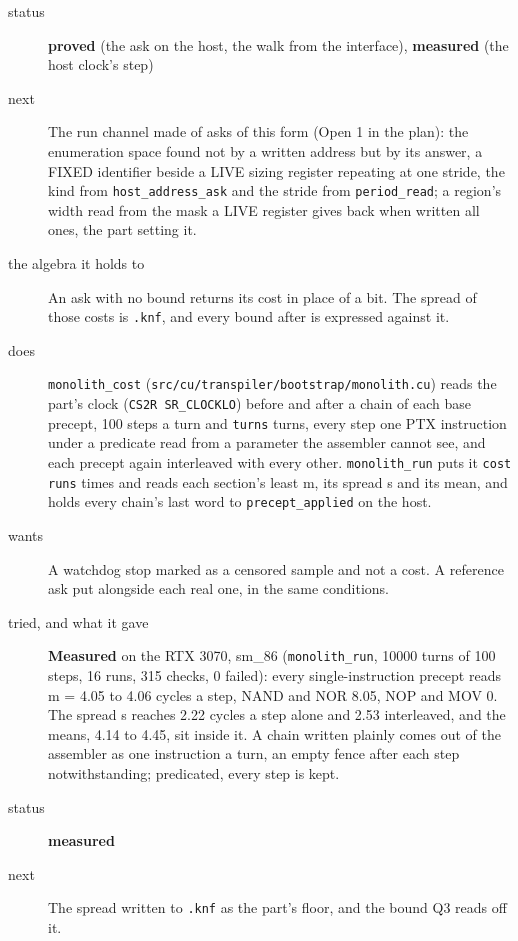 \begin{description}
\item[{status}] \textbf{proved} (the ask on the host, the walk from the interface), \textbf{measured} (the host clock's step)
\item[{next}] The run channel made of asks of this form (Open 1 in the plan): the enumeration space found not by a written address but by its answer, a FIXED identifier beside a LIVE sizing register repeating at one stride, the kind from \texttt{host\_\allowbreak{}address\_\allowbreak{}ask} and the stride from \texttt{period\_\allowbreak{}read}; a region's width read from the mask a LIVE register gives back when written all ones, the part setting it.
\end{description}

\begin{description}
\item[{the algebra it holds to}] An ask with no bound returns its cost in place of a bit. The spread of those costs is \texttt{.\allowbreak{}knf}, and every bound after is expressed against it.
\item[{does}] \texttt{monolith\_\allowbreak{}cost} (\texttt{src/\allowbreak{}cu/\allowbreak{}transpiler/\allowbreak{}bootstrap/\allowbreak{}monolith.\allowbreak{}cu}) reads the part's clock (\texttt{CS2R SR\_\allowbreak{}CLOCKLO}) before and after a chain of each base precept, 100 steps a turn and \texttt{turns} turns, every step one PTX instruction under a predicate read from a parameter the assembler cannot see, and each precept again interleaved with every other. \texttt{monolith\_\allowbreak{}run} puts it \texttt{cost runs} times and reads each section's least m, its spread s and its mean, and holds every chain's last word to \texttt{precept\_\allowbreak{}applied} on the host.
\item[{wants}] A watchdog stop marked as a censored sample and not a cost. A reference ask put alongside each real one, in the same conditions.
\item[{tried, and what it gave}] \textbf{Measured} on the RTX 3070, sm\_\allowbreak{}86 (\texttt{monolith\_\allowbreak{}run}, 10000 turns of 100 steps, 16 runs, 315 checks, 0 failed): every single-instruction precept reads m = 4.05 to 4.06 cycles a step, NAND and NOR 8.05, NOP and MOV 0. The spread s reaches 2.22 cycles a step alone and 2.53 interleaved, and the means, 4.14 to 4.45, sit inside it. A chain written plainly comes out of the assembler as one instruction a turn, an empty fence after each step notwithstanding; predicated, every step is kept.
\item[{status}] \textbf{measured}
\item[{next}] The spread written to \texttt{.\allowbreak{}knf} as the part's floor, and the bound Q3 reads off it.
\end{description}

